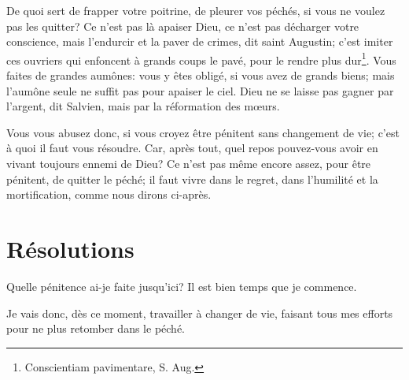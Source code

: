 \documentclass[instructions.tex]{subfiles}
\begin{document}
De quoi sert de frapper votre poitrine, de pleurer vos péchés, si vous ne voulez pas les quitter? Ce n’est pas là apaiser Dieu, ce n’est pas décharger votre conscience, mais l’endurcir et la paver de crimes, dit saint Augustin; c’est imiter ces ouvriers qui enfoncent à grands coups le pavé, pour le rendre plus dur\footnote{Conscientiam pavimentare, S. Aug.}. Vous faites de grandes aumônes: vous y êtes obligé, si vous avez de grands biens; mais l’aumône seule ne suffit pas pour apaiser le ciel. Dieu ne se laisse pas gagner par l’argent, dit Salvien, mais par la réformation des mœurs.
 
Vous vous abusez donc, si vous croyez être pénitent sans changement de vie; c’est à quoi il faut vous résoudre. Car, après tout, quel repos pouvez-vous avoir en vivant toujours ennemi de Dieu? Ce n’est pas même encore assez, pour être pénitent, de quitter le péché; il faut vivre dans le regret, dans l’humilité et la mortification, comme nous dirons ci-après.
 
\section{Résolutions}
 
\primo Quelle pénitence ai-je faite jusqu’ici? Il est bien temps que je commence.
 
\secundo Je vais donc, dès ce moment, travailler à changer de vie, faisant tous mes efforts pour ne plus retomber dans le péché. 

 
\end{document}
